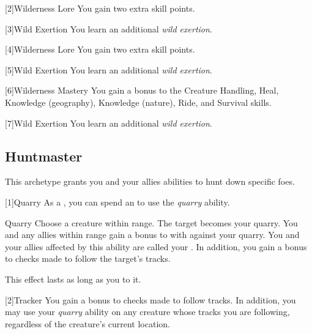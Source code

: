         [2]{Wilderness Lore} You gain two extra skill points.

        [3]{Wild Exertion}
        You learn an additional \textit{wild exertion}.

        [4]{Wilderness Lore} You gain two extra skill points.

        [5]{Wild Exertion} 
        You learn an additional \textit{wild exertion}.

        [6]{Wilderness Mastery} You gain a  bonus to the Creature Handling, Heal, Knowledge (geography), Knowledge (nature), Ride, and Survival skills.

        [7]{Wild Exertion} 
        You learn an additional \textit{wild exertion}.

    \subsection{Huntmaster}
        This archetype grants you and your allies abilities to hunt down specific foes.

        [1]{Quarry}\label{Quarry} As a , you can spend an  to use the \textit{quarry} ability.
        \begin{ability}{Quarry}
            Choose a creature within \rnglong range.
            The target becomes your quarry.
            You and any allies within range gain a  bonus to  with  against your quarry.
            You and your allies affected by this ability are called your .
            In addition, you gain a  bonus to checks made to follow the target's tracks.

            This effect lasts as long as you  to it.
        \end{ability}

        [2]{Tracker}
        You gain a  bonus to checks made to follow tracks.
        In addition, you may use your \textit{quarry} ability on any creature whose tracks you are following, regardless of the creature's current location.

